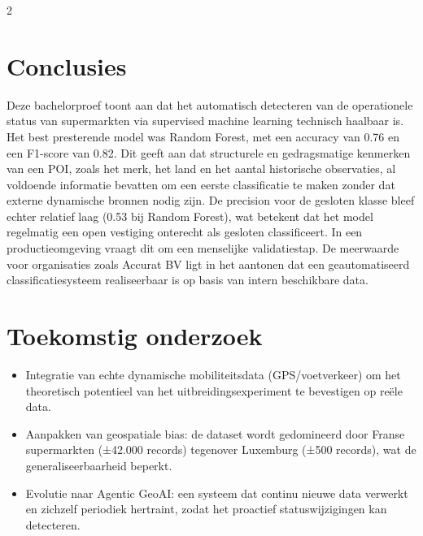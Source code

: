 \documentclass[a0,portrait]{hogent-poster}
\begin{document}
\begin{multicols}{2}
\section{Conclusies}
Deze bachelorproef toont aan dat het automatisch detecteren van de operationele status van supermarkten via supervised machine learning technisch haalbaar is. Het best presterende model was Random Forest, met een accuracy van 0.76 en een F1-score van 0.82. Dit geeft aan dat structurele en gedragsmatige kenmerken van een POI, zoals het merk, het land en het aantal historische observaties, al voldoende informatie bevatten om een eerste classificatie te maken zonder dat externe dynamische bronnen nodig zijn. De precision voor de gesloten klasse bleef echter relatief laag (0.53 bij Random Forest), wat betekent dat het model regelmatig een open vestiging onterecht als gesloten classificeert. In een productieomgeving vraagt dit om een menselijke validatiestap. De meerwaarde voor organisaties zoals Accurat BV ligt in het aantonen dat een geautomatiseerd classificatiesysteem realiseerbaar is op basis van intern beschikbare data.

\section{Toekomstig onderzoek}

\begin{itemize}
    \item Integratie van echte dynamische mobiliteitsdata (GPS/voetverkeer) om het theoretisch potentieel van het uitbreidingsexperiment te bevestigen op reële data.
    \item Aanpakken van geospatiale bias: de dataset wordt gedomineerd door Franse supermarkten (±42.000 records) tegenover Luxemburg (±500 records), wat de generaliseerbaarheid beperkt.
    \item Evolutie naar Agentic GeoAI: een systeem dat continu nieuwe data verwerkt en zichzelf periodiek hertraint, zodat het proactief statuswijzigingen kan detecteren.
\end{itemize}

\end{multicols}
\end{document}
